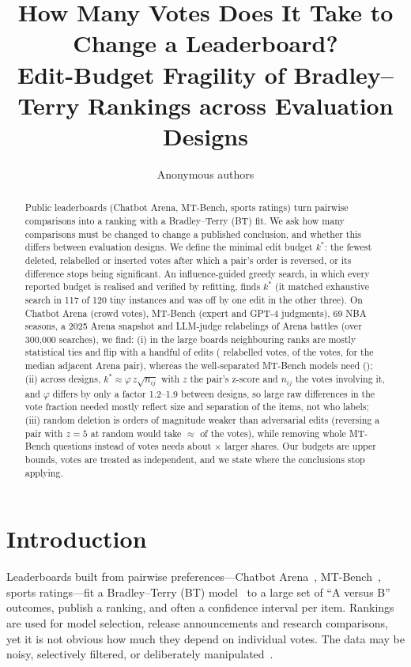 \documentclass{article}
\title{How Many Votes Does It Take to Change a Leaderboard?\\
Edit-Budget Fragility of Bradley--Terry Rankings across Evaluation Designs}
\author{Anonymous authors}
\newcommand{\nij}{n_{ij}}
\newcommand{\kstar}{k^\ast}
\begin{document}
\maketitle

\begin{abstract}
Public leaderboards (Chatbot Arena, MT-Bench, sports ratings) turn pairwise comparisons into a ranking with a Bradley--Terry (BT) fit. We ask how many comparisons must be changed to change a published conclusion, and whether this differs between evaluation designs. We define the minimal edit budget $\kstar$: the fewest deleted, relabelled or inserted votes after which a pair's order is reversed, or its difference stops being significant. An influence-guided greedy search, in which every reported budget is realised and verified by refitting, finds $\kstar$ (it matched exhaustive search in 117 of 120 tiny instances and was off by one edit in the other three). On Chatbot Arena (crowd votes), MT-Bench (expert and GPT-4 judgments), 69 NBA seasons, a 2025 Arena snapshot and LLM-judge relabelings of Arena battles (over 300{,}000 searches), we find: (i) in the large boards neighbouring ranks are mostly statistical ties and flip with a handful of edits (\Nadjkarenarelabel{} relabelled votes, \Nadjalphaarenarelabel{} of the votes, for the median adjacent Arena pair), whereas the well-separated MT-Bench models need \Nadjkmthumanrelabel{} (\Nadjalphamthumanrelabel{}); (ii) across designs, $\kstar\approx\varphi\,z\sqrt{\nij}$ with $z$ the pair's z-score and $\nij$ the votes involving it, and $\varphi$ differs by only a factor 1.2--1.9 between designs, so large raw differences in the vote fraction needed mostly reflect size and separation of the items, not who labels; (iii) random deletion is orders of magnitude weaker than adversarial edits (reversing a pair with $z{=}5$ at random would take $\approx$\NrandneedFive{} of the votes), while removing whole MT-Bench questions instead of votes needs about \Nclratiomth$\times$ larger shares. Our budgets are upper bounds, votes are treated as independent, and we state where the conclusions stop applying.
\end{abstract}

\section{Introduction}
Leaderboards built from pairwise preferences---Chatbot Arena~\citep{chiang2024arena}, MT-Bench~\citep{zheng2023judging}, sports ratings---fit a Bradley--Terry (BT) model~\citep{bradley1952rank} to a large set of ``A versus B'' outcomes, publish a ranking, and often a confidence interval per item. Rankings are used for model selection, release announcements and research comparisons, yet it is not obvious how much they depend on individual votes. The data may be noisy, selectively filtered, or deliberately manipulated~\citep{min2025rigging,singh2025illusion}.
\end{document}

